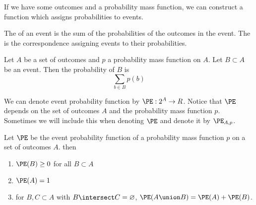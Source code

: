 
\sbasic




















\sstart
{}


If we have some outcomes and
a probability mass function,
we can construct a function which
assigns probabilities to events.


The 
of an event is the sum
of the probabilities of
the outcomes in the event.
The 
is the correspondence assigning
events to their probabilities.


Let $A$ be a set of outcomes
and $p$ a probability mass function
on $A$.
Let $B \subset A$ be an event.
Then the probability of $B$
is
\[
  \sum_{b \in B} p(b)
\]

We can denote event probability function
by $\PE: 2^A \to R$.
Notice that $\PE$ depends on the set of
outcomes $A$ and the probability mass function
$p$. Sometimes we will include this when
denoting $\PE$ and denote it by $\PE_{A, p}$.


\begin{prop}
Let $\PE$ be the event probability function
of a probability mass function $p$ on a set
of outcomes $A$. then
\begin{enumerate}
\item $\PE(B) \geq 0$ for all $B \subset A$
\item $\PE(A) = 1$
\item for $B, C \subset A$ with $B \intersect C = \emptyset$,
  $\PE(A \union B) = \PE(A) + \PE(B)$.
\end{enumerate}
\end{prop}


\strats
